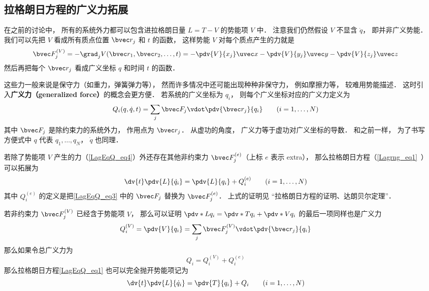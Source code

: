 

\subsection{拉格朗日方程的广义力拓展}
在之前的讨论中， 所有的系统外力都可以包含进拉格朗日量 $L = T-V$ 的势能项 $V$ 中． 注意我们仍然假设 $V$ 不显含 $\dot q$， 即并非广义势能． 我们可以先把 $V$ 看成所有质点位置 $\bvec r_j$ 和 $t$ 的函数， 这样势能 $V$ 对每个质点产生的力就是
\begin{equation}\label{LagEqQ_eq4}
\bvec F_j^{(V)} = - \grad_j V(\bvec r_1,\bvec r_2,\dots,t) = -\pdv{V}{x_j}\uvec x - \pdv{V}{y_j}\uvec y - \pdv{V}{z_j} \uvec z
\end{equation}
然后再把每个 $\bvec r_j$ 看成广义坐标 $q$ 和时间 $t$ 的函数．

这些力一般来说是保守力（如重力，弹簧弹力等）， 然而许多情况中还可能出现种种非保守力， 例如摩擦力等， 较难用势能描述． 这时引入\textbf{广义力（generalized force）}的概念会更方便． 若系统的广义坐标为 $q_i$， 则每个广义坐标对应的广义力定义为
\begin{equation}\label{LagEqQ_eq3}
Q_i(q, \dot q, t) = \sum_j \bvec F_j \vdot \pdv{\bvec r_j}{q_i} \qquad (i=1,\dots,N)
\end{equation}
其中 $\bvec F_j$ 是除约束力的系统外力， 作用点为 $\bvec r_j$． 从虚功的角度， 广义力等于虚功对广义坐标的导数． 和之前一样， 为了书写方便式中 $q$ 代表 $q_1, \dots, q_N$， $\dot q$ 也同理．

若除了势能项 $V$ 产生的力（\autoref{LagEqQ_eq4}）外还存在其他非约束力 $\bvec F_j^{(e)}$（上标 $e$ 表示 extra）， 那么拉格朗日方程（\autoref{Lagrng_eq1}~）可以拓展为
\begin{equation}\label{LagEqQ_eq1}
\dv{t} \pdv{L}{\dot q_i} = \pdv{L}{q_i} + Q_i^{(e)}
\qquad (i=1,\dots,N)
\end{equation}
其中 $Q_i^{(e)}$ 的定义是把\autoref{LagEqQ_eq3} 中的 $\bvec F_j$ 替换为 $\bvec F_j^{(e)}$． 上式的证明见 “拉格朗日方程的证明、达朗贝尔定理”．

若非约束力 $\bvec F_j^{(V)}$ 已经含于势能项 $V$， 那么可以证明 $\pdv*{L}{q_i} = \pdv*{T}{q_i} + \pdv*{V}{q_i}$ 的最后一项同样也是广义力
\begin{equation}
Q_i^{(V)} = \pdv{V}{q_i} = \sum_j \bvec F_j^{(V)} \vdot \pdv{\bvec r_j}{q_i}
\end{equation}
那么如果令总广义力为
\begin{equation}
Q_i = Q_i^{(V)} + Q_i^{(e)}
\end{equation}
那么拉格朗日方程\autoref{LagEqQ_eq1} 也可以完全抛开势能项记为
\begin{equation}\label{LagEqQ_eq2}
\dv{t} \pdv{L}{\dot q_i} = \pdv{T}{q_i} + Q_i
\qquad (i=1,\dots,N)
\end{equation}

